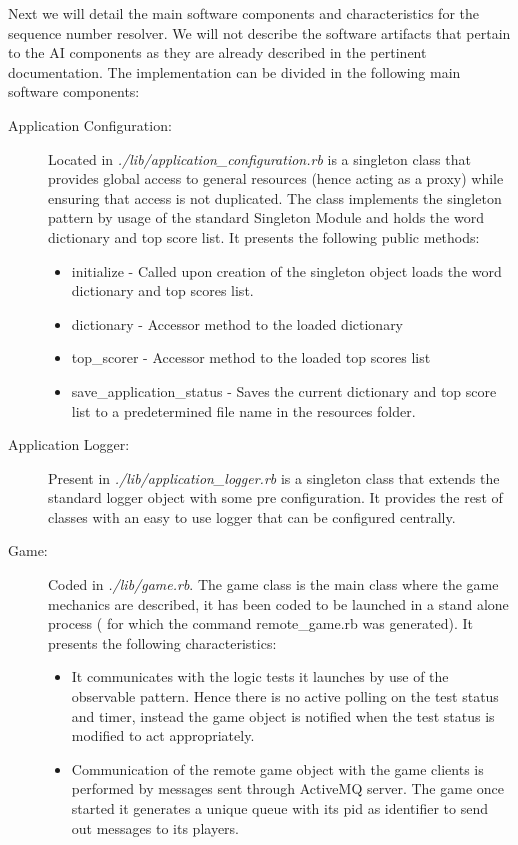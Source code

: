 \documentclass[a4paper,10pt,titlepage]{article}
\begin{document}
\par Next we will detail the main software components and characteristics for the sequence number resolver. We will not describe the software artifacts that pertain to the AI components as they are already described in the pertinent documentation. The implementation can be divided in the following main software components:
\begin{description}
	\item[Application Configuration:] Located in \textit{./lib/application\_configuration.rb} is a singleton class that provides global access to general resources (hence acting as a proxy) while ensuring that access is not duplicated. The class implements the singleton pattern by usage of the standard Singleton Module and holds the word dictionary and top score list. It presents the following public methods:
	\begin{itemize}
		\item initialize - Called upon creation of the singleton object loads the word dictionary and top scores list.
		\item dictionary - Accessor method to the loaded dictionary
		\item top\_scorer - Accessor method to the loaded top scores list
		\item save\_application\_status - Saves the current dictionary and top score list to a predetermined file name in the resources folder. 
	\end{itemize}
	\item[Application Logger:] Present in \textit{./lib/application\_logger.rb} is a singleton class that extends the standard logger object with some pre configuration. It provides the rest of classes with an easy to use logger that can be configured centrally. 
	\item[Game:] Coded in \textit{./lib/game.rb}. The game class is the main class where the game mechanics are described, it has been coded to be launched in a stand alone process ( for which the command remote\_game.rb was generated). It presents the following characteristics:
	\begin{itemize}
		\item It communicates with the logic tests it launches by use of the observable pattern. Hence there is no active polling on the test status and timer, instead the game object is notified when the test status is modified to act appropriately.
		\item Communication of the remote game object with the game clients is performed by messages sent through ActiveMQ server. The game once started it generates a unique queue with its pid as identifier to send out messages to its players.

\end{itemize}
\end{description}
\end{document}
